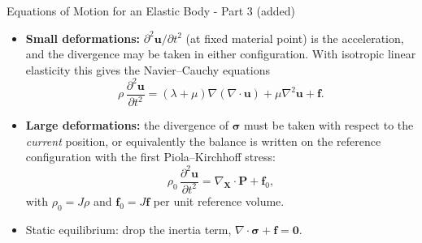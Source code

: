\documentclass{beamer}
\begin{document}
\begin{frame}{Equations of Motion for an Elastic Body - Part 3 (added)}
    \begin{itemize}
        \item \textbf{Small deformations:} $\partial^2\mathbf{u}/\partial t^2$ (at fixed material point) is the acceleration, and the divergence may be taken in either configuration. With isotropic linear elasticity this gives the Navier--Cauchy equations
        \begin{equation*}
        \rho\,\frac{\partial^2\mathbf{u}}{\partial t^2} = (\lambda+\mu)\nabla(\nabla\cdot\mathbf{u}) + \mu\nabla^2\mathbf{u} + \mathbf{f}.
        \end{equation*}
        \item \textbf{Large deformations:} the divergence of $\boldsymbol{\sigma}$ must be taken with respect to the \emph{current} position, or equivalently the balance is written on the reference configuration with the first Piola--Kirchhoff stress:
        \begin{equation*}
        \rho_0\,\frac{\partial^2\mathbf{u}}{\partial t^2} = \nabla_{\mathbf{X}}\cdot\mathbf{P} + \mathbf{f}_0 ,
        \end{equation*}
        with $\rho_0 = J\rho$ and $\mathbf{f}_0 = J\mathbf{f}$ per unit reference volume.
        \item Static equilibrium: drop the inertia term, $\nabla\cdot\boldsymbol{\sigma} + \mathbf{f} = \mathbf{0}$.
    \end{itemize}
\end{frame}
\end{document}
